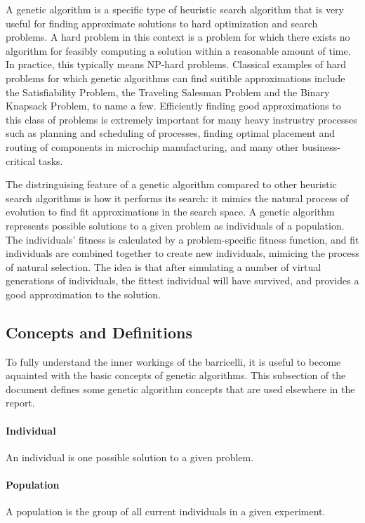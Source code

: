 A genetic algorithm is a specific type of heuristic search algorithm that is very useful for finding approximate solutions to hard optimization and search problems.
A hard problem in this context is a problem for which there exists no algorithm for feasibly computing a solution within a reasonable amount of time.
In practice, this typically means NP-hard problems.
Classical examples of hard problems for which genetic algorithms can find suitible approximations include the Satisfiability Problem, the Traveling Salesman Problem and the Binary Knapsack Problem, to name a few.
Efficiently finding good approximations to this class of problems is extremely important for many heavy instrustry processes such as planning and scheduling of processes, finding optimal placement and routing of components in microchip manufacturing, and many other business-critical tasks.

The distringuising feature of a genetic algorithm compared to other heuristic search algorithms is how it performs its search: it mimics the natural process of evolution to find fit approximations in the search space.
A genetic algorithm represents possible solutions to a given problem as individuals of a population.
The individuals' fitness is calculated by a problem-specific fitness function, and fit individuals are combined together to create new individuals, mimicing the process of natural selection.
The idea is that after simulating a number of virtual generations of individuals, the fittest individual will have survived, and provides a good approximation to the solution.

\subsection{Concepts and Definitions}

To fully understand the inner workings of the \Gls{barricelli}, it is useful to become aquainted with the basic concepts of genetic algorithms.
This subsection of the document defines some genetic algorithm concepts that are used elsewhere in the report.

\paragraph{Individual}
An individual is one possible solution to a given problem.

\paragraph{Population}
A population is the group of all current individuals in a given experiment.

